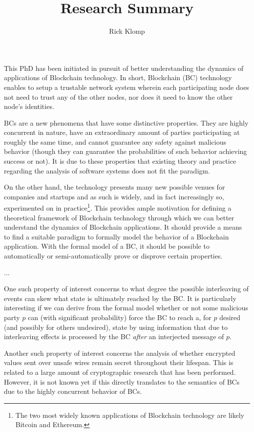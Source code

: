 \documentclass[]{article}
\title{Research Summary}
\author{Rick Klomp}
\begin{document}
\maketitle

This PhD has been initiated in pursuit of better understanding the dynamics of applications of Blockchain technology. In short, Blockchain (BC) technology enables to setup a trustable network system wherein each participating node does not need to trust any of the other nodes, nor does it need to know the other node's identities.

BCs are a new phenomena that have some distinctive properties. They are highly concurrent in nature, have an extraordinary amount of parties participating at roughly the same time, and cannot guarantee any safety against malicious behavior (though they can guarantee the probabilities of such behavior achieving success or not). It is due to these properties that existing theory and practice regarding the analysis of software systems does not fit the paradigm.

On the other hand, the technology presents many new possible venues for companies and startups and as such is widely, and in fact increasingly so, experimented on in practice\footnote{
	The two most widely known applications of Blockchain technology are likely Bitcoin and Ethereum.
}. This provides ample motivation for defining a theoretical framework of Blockchain technology through which we can better understand the dynamics of Blockchain applications. It should provide a means to find a suitable paradigm to formally model the behavior of a Blockchain application. With the formal model of a BC, it should be possible to automatically or semi-automatically prove or disprove certain properties.

...

One such property of interest concerns to what degree the possible interleaving of events can skew what state is ultimately reached by the BC. It is particularly interesting if we can derive from the formal model whether or not some malicious party $p$ can (with significant probability) force the BC to reach a, for $p$ desired (and possibly for others undesired), state by using information that due to interleaving effects is processed by the BC \emph{after} an interjected message of $p$.

Another such property of interest concerns the analysis of whether encrypted values sent over unsafe wires remain secret throughout their lifespan. This is related to a large amount of cryptographic research that has been performed. However, it is not known yet if this directly translates to the semantics of BCs due to the highly concurrent behavior of BCs.
\end{document}
